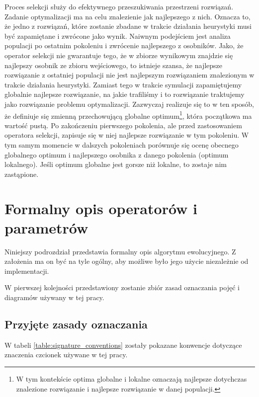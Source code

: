 \documentclass[./FM_mgr.tex]{subfiles}
\begin{document}
Proces selekcji służy do efektywnego przeszukiwania przestrzeni rozwiązań.
Zadanie optymalizacji ma na celu znalezienie jak najlepszego z nich.
Oznacza to, że jedno z rozwiązań, które zostanie zbadane w trakcie działania heurystyki musi być zapamiętane i zwrócone jako wynik. 
Naiwnym podejściem jest analiza populacji po ostatnim pokoleniu i zwrócenie najlepszego z osobników. 
Jako, że operator selekcji nie gwarantuje tego, że w zbiorze wynikowym znajdzie się najlepszy osobnik ze zbioru wejściowego, to istnieje szansa, że najlepsze rozwiązanie z ostatniej populacji nie jest najlepszym rozwiązaniem znalezionym w trakcie działania heurystyki. 
Zamiast tego w trakcie symulacji zapamiętujemy globalnie najlepsze rozwiązanie, na jakie trafiliśmy i to rozwiązanie traktujemy jako rozwiązanie problemu optymalizacji.
Zazwyczaj realizuje się to w ten sposób, że definiuje się zmienną przechowującą globalne optimum\footnote{
	W tym kontekście optima globalne i lokalne oznaczają najlepsze dotychczas znalezione rozwiązanie i najlepsze rozwiązanie w danej populacji.
}, która początkowa ma wartość pustą.
Po zakończeniu pierwszego pokolenia, ale przed zastosowaniem operatora selekcji, zapisuje się w niej najlepsze rozwiązanie w tym pokoleniu.
W tym samym momencie w dalszych pokoleniach porównuje się ocenę obecnego globalnego optimum i najlepszego osobnika z danego pokolenia (optimum lokalnego). 
Jeśli optimum globalne jest gorsze niż lokalne, to zostaje nim zastąpione.

\section{Formalny opis operatorów i parametrów}

Niniejszy podrozdział przedstawia formalny opis algorytmu ewolucyjnego.
Z założenia ma on być na tyle ogólny, aby możliwe było jego użycie niezależnie od implementacji.

W pierwszej kolejności przedstawiony zostanie zbiór zasad oznaczania pojęć i diagramów używany w tej pracy.

\subsection{Przyjęte zasady oznaczania} \label{subsection:conventions}

W tabeli \ref{table:signature_conventions} zostały pokazane konwencje dotyczące znaczenia czcionek używane w tej pracy.
\end{document}
